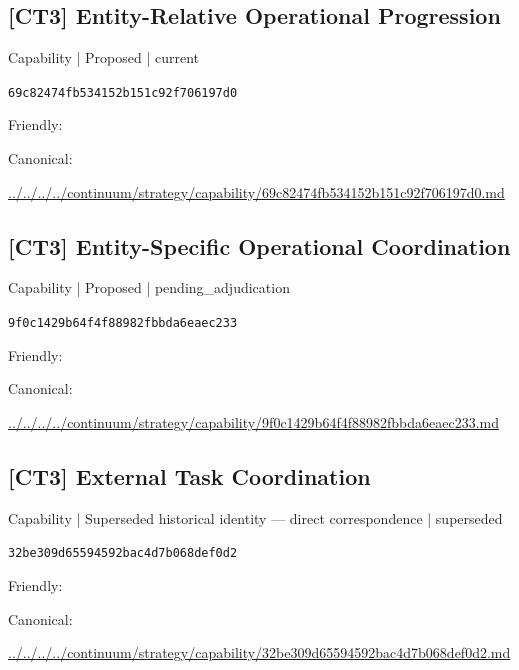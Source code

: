 \documentclass[10pt,a4paper]{article}
\begin{document}
\subsection*{[CT3] Entity-Relative Operational Progression}
{\small Capability | Proposed | current}\par
\texttt{69c82474fb534152b151c92f706197d0}\par
Friendly: \par
Canonical: \par
{\footnotesize\url{../../../../continuum/strategy/capability/69c82474fb534152b151c92f706197d0.md}}\par
\subsection*{[CT3] Entity-Specific Operational Coordination}
{\small Capability | Proposed | pending\_adjudication}\par
\texttt{9f0c1429b64f4f88982fbbda6eaec233}\par
Friendly: \par
Canonical: \par
{\footnotesize\url{../../../../continuum/strategy/capability/9f0c1429b64f4f88982fbbda6eaec233.md}}\par
\subsection*{[CT3] External Task Coordination}
{\small Capability | Superseded historical identity — direct correspondence | superseded}\par
\texttt{32be309d65594592bac4d7b068def0d2}\par
Friendly: \par
Canonical: \par
{\footnotesize\url{../../../../continuum/strategy/capability/32be309d65594592bac4d7b068def0d2.md}}\par
\end{document}
